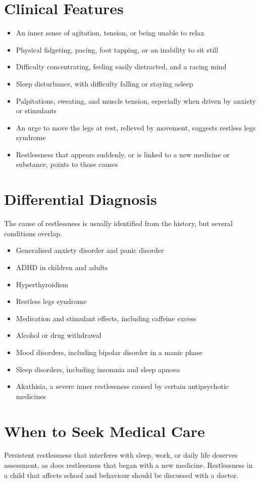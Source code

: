 \section*{Clinical Features}
\begin{itemize}
    \item An inner sense of agitation, tension, or being unable to relax
    \item Physical fidgeting, pacing, foot tapping, or an inability to sit still
    \item Difficulty concentrating, feeling easily distracted, and a racing mind
    \item Sleep disturbance, with difficulty falling or staying asleep
    \item Palpitations, sweating, and muscle tension, especially when driven by anxiety or stimulants
    \item An urge to move the legs at rest, relieved by movement, suggests restless legs syndrome
    \item Restlessness that appears suddenly, or is linked to a new medicine or substance, points to those causes
\end{itemize}

\section*{Differential Diagnosis}
The cause of restlessness is usually identified from the history, but several conditions overlap.
\begin{itemize}
    \item Generalised anxiety disorder and panic disorder
    \item ADHD in children and adults
    \item Hyperthyroidism
    \item Restless legs syndrome
    \item Medication and stimulant effects, including caffeine excess
    \item Alcohol or drug withdrawal
    \item Mood disorders, including bipolar disorder in a manic phase
    \item Sleep disorders, including insomnia and sleep apnoea
    \item Akathisia, a severe inner restlessness caused by certain antipsychotic medicines
\end{itemize}

\section*{When to Seek Medical Care}
Persistent restlessness that interferes with sleep, work, or daily life deserves assessment, as does restlessness that began with a new medicine. Restlessness in a child that affects school and behaviour should be discussed with a doctor.

